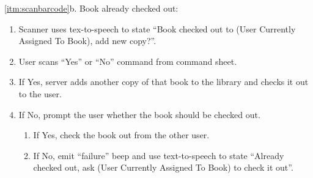 \documentclass[a4paper, 10pt, oneside, draft]{article}
\begin{document}
\begin{usecase}
{    \item[\ref{itm:scanbarcode}b.] Book already checked out:
        \begin{enumerate}[1.]
        \item Scanner uses tex-to-speech to state ``Book checked out to (User
            Currently Assigned To Book), add new copy?''.
        \item User scans ``Yes'' or ``No'' command from command sheet.
        \item If Yes, server adds another copy of that book to the library and
            checks it out to the user.
        \item If No, prompt the user whether the book should be checked out.
            \begin{enumerate}[1.]
            \item If Yes, check the book out from the other user.
            \item If No, emit ``failure'' beep and use text-to-speech to state
                ``Already checked out, ask (User Currently Assigned To Book)
                to check it out''.
            \end{enumerate}
        \end{enumerate}
}





\end{usecase}



\newpage
\end{document}
